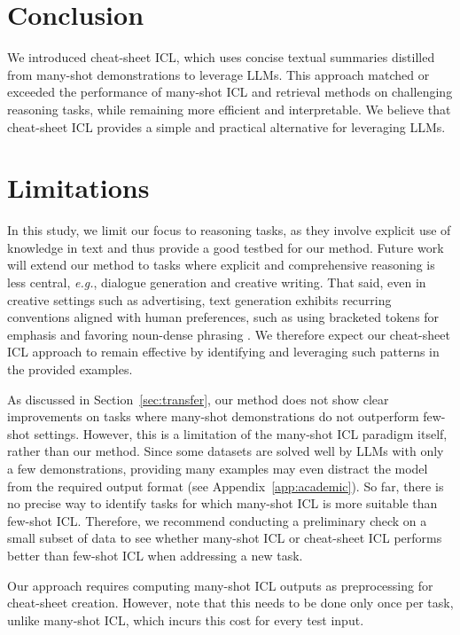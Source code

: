 \documentclass[11pt]{article}
\begin{document}
\section{Conclusion}
\label{sec:conclusion}

We introduced cheat-sheet ICL, which uses concise textual summaries distilled from many-shot demonstrations to leverage LLMs.
This approach matched or exceeded the performance of many-shot ICL and retrieval methods on challenging reasoning tasks, while remaining more efficient and interpretable.
We believe that cheat-sheet ICL provides a simple and practical alternative for leveraging LLMs.


\section*{Limitations}
\label{sec:limitations}

In this study, we limit our focus to reasoning tasks, as they involve explicit use of knowledge in text and thus provide a good testbed for our method.
Future work will extend our method to tasks where explicit and comprehensive reasoning is less central, \emph{e.g.}, dialogue generation and creative writing.
That said, even in creative settings such as advertising, text generation exhibits recurring conventions aligned with human preferences, such as using bracketed tokens for emphasis and favoring noun-dense phrasing \citep{murakami-etal-2025-adparaphrase,murakami-etal-2025-adparaphrase-v2}.
We therefore expect our cheat-sheet ICL approach to remain effective by identifying and leveraging such patterns in the provided examples.

As discussed in Section~\ref{sec:transfer}, our method does not show clear improvements on tasks where many-shot demonstrations do not outperform few-shot settings.
However, this is a limitation of the many-shot ICL paradigm itself, rather than our method.
Since some datasets are solved well by LLMs with only a few demonstrations, providing many examples may even distract the model from the required output format (see Appendix~\ref{app:academic}).
So far, there is no precise way to identify tasks for which many-shot ICL is more suitable than few-shot ICL.
Therefore, we recommend conducting a preliminary check on a small subset of data to see whether many-shot ICL or cheat-sheet ICL performs better than few-shot ICL when addressing a new task.

Our approach requires computing many-shot ICL outputs as preprocessing for cheat-sheet creation.
However, note that this needs to be done only once per task, unlike many-shot ICL, which incurs this cost for every test input.
\end{document}
